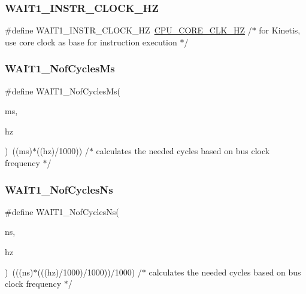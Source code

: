 \subsubsection{\texorpdfstring{W\+A\+I\+T1\+\_\+\+I\+N\+S\+T\+R\+\_\+\+C\+L\+O\+C\+K\+\_\+\+HZ}{WAIT1\_INSTR\_CLOCK\_HZ}}
{\footnotesize\ttfamily \#define W\+A\+I\+T1\+\_\+\+I\+N\+S\+T\+R\+\_\+\+C\+L\+O\+C\+K\+\_\+\+HZ~\hyperlink{group___cpu__module_ga9dee0abd722c849e54c662ab11a1d2cf}{C\+P\+U\+\_\+\+C\+O\+R\+E\+\_\+\+C\+L\+K\+\_\+\+HZ} /$\ast$ for Kinetis, use core clock as base for instruction execution $\ast$/}

\mbox{\label{group___w_a_i_t1__module_ga7e74874c42a8979fb279fc86d373b60a}} 
\subsubsection{\texorpdfstring{W\+A\+I\+T1\+\_\+\+Nof\+Cycles\+Ms}{WAIT1\_NofCyclesMs}}
{\footnotesize\ttfamily \#define W\+A\+I\+T1\+\_\+\+Nof\+Cycles\+Ms(\begin{DoxyParamCaption}\item[{}]{ms,  }\item[{}]{hz }\end{DoxyParamCaption})~((ms)$\ast$((hz)/1000)) /$\ast$ calculates the needed cycles based on bus clock frequency $\ast$/}

\mbox{\label{group___w_a_i_t1__module_gaca73593e1131b4845062bd9ec4ee5cac}} 
\subsubsection{\texorpdfstring{W\+A\+I\+T1\+\_\+\+Nof\+Cycles\+Ns}{WAIT1\_NofCyclesNs}}
{\footnotesize\ttfamily \#define W\+A\+I\+T1\+\_\+\+Nof\+Cycles\+Ns(\begin{DoxyParamCaption}\item[{}]{ns,  }\item[{}]{hz }\end{DoxyParamCaption})~(((ns)$\ast$(((hz)/1000)/1000))/1000) /$\ast$ calculates the needed cycles based on bus clock frequency $\ast$/}

